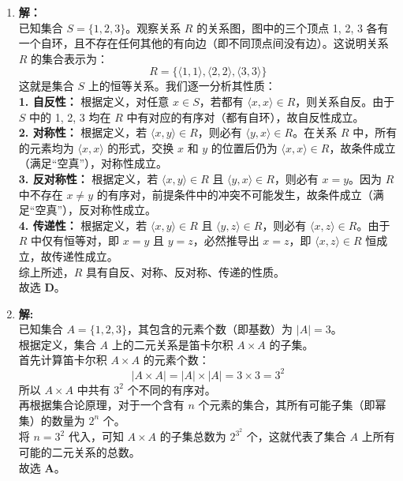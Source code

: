 \begin{enumerate}
	\item \textbf{解：}\\
	已知集合 $S = \{1, 2, 3\}$。观察关系 $R$ 的关系图，图中的三个顶点 1, 2, 3 各有一个自环，且不存在任何其他的有向边（即不同顶点间没有边）。这说明关系 $R$ 的集合表示为：
	\[ R = \{\langle 1, 1 \rangle, \langle 2, 2 \rangle, \langle 3, 3 \rangle\} \]
	这就是集合 $S$ 上的恒等关系。我们逐一分析其性质：\\
	\textbf{1. 自反性：} 根据定义，对任意 $x \in S$，若都有 $\langle x, x \rangle \in R$，则关系自反。由于 $S$ 中的 1, 2, 3 均在 $R$ 中有对应的有序对（都有自环），故自反性成立。\\
	\textbf{2. 对称性：} 根据定义，若 $\langle x, y \rangle \in R$，则必有 $\langle y, x \rangle \in R$。在关系 $R$ 中，所有的元素均为 $\langle x, x \rangle$ 的形式，交换 $x$ 和 $y$ 的位置后仍为 $\langle x, x \rangle \in R$，故条件成立（满足“空真”），对称性成立。\\
	\textbf{3. 反对称性：} 根据定义，若 $\langle x, y \rangle \in R$ 且 $\langle y, x \rangle \in R$，则必有 $x = y$。因为 $R$ 中不存在 $x \neq y$ 的有序对，前提条件中的冲突不可能发生，故条件成立（满足“空真”），反对称性成立。\\
	\textbf{4. 传递性：} 根据定义，若 $\langle x, y \rangle \in R$ 且 $\langle y, z \rangle \in R$，则必有 $\langle x, z \rangle \in R$。由于 $R$ 中仅有恒等对，即 $x=y$ 且 $y=z$，必然推导出 $x=z$，即 $\langle x, z \rangle \in R$ 恒成立，故传递性成立。\\
	综上所述，$R$ 具有自反、对称、反对称、传递的性质。\\
	故选 \textbf{D}。
	
	\vspace{1em}
	
	\item \textbf{解:}\\
	已知集合 $A = \{1, 2, 3\}$，其包含的元素个数（即基数）为 $|A| = 3$。\\
	根据定义，集合 $A$ 上的二元关系是笛卡尔积 $A \times A$ 的子集。\\
	首先计算笛卡尔积 $A \times A$ 的元素个数：
	\[ |A \times A| = |A| \times |A| = 3 \times 3 = 3^2 \]
	所以 $A \times A$ 中共有 $3^2$ 个不同的有序对。\\
	再根据集合论原理，对于一个含有 $n$ 个元素的集合，其所有可能子集（即幂集）的数量为 $2^n$ 个。\\
	将 $n = 3^2$ 代入，可知 $A \times A$ 的子集总数为 $2^{3^2}$ 个，这就代表了集合 $A$ 上所有可能的二元关系的总数。\\
	故选 \textbf{A}。
	

\end{enumerate}
